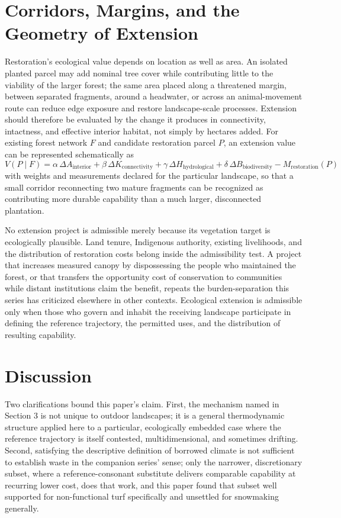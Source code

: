 \documentclass[11pt]{article}
\begin{document}
\section{Corridors, Margins, and the Geometry of Extension}

Restoration's ecological value depends on location as well as area. An isolated planted parcel may add nominal tree cover while contributing little to the viability of the larger forest; the same area placed along a threatened margin, between separated fragments, around a headwater, or across an animal-movement route can reduce edge exposure and restore landscape-scale processes. Extension should therefore be evaluated by the change it produces in connectivity, intactness, and effective interior habitat, not simply by hectares added. For existing forest network $F$ and candidate restoration parcel $P$, an extension value can be represented schematically as
\[
V(P \mid F) = \alpha\,\Delta A_{\text{interior}} + \beta\,\Delta K_{\text{connectivity}} + \gamma\,\Delta H_{\text{hydrological}} + \delta\,\Delta B_{\text{biodiversity}} - M_{\text{restoration}}(P)
\]
with weights and measurements declared for the particular landscape, so that a small corridor reconnecting two mature fragments can be recognized as contributing more durable capability than a much larger, disconnected plantation.

No extension project is admissible merely because its vegetation target is ecologically plausible. Land tenure, Indigenous authority, existing livelihoods, and the distribution of restoration costs belong inside the admissibility test. A project that increases measured canopy by dispossessing the people who maintained the forest, or that transfers the opportunity cost of conservation to communities while distant institutions claim the benefit, repeats the burden-separation this series has criticized elsewhere in other contexts. Ecological extension is admissible only when those who govern and inhabit the receiving landscape participate in defining the reference trajectory, the permitted uses, and the distribution of resulting capability.

\section{Discussion}

Two clarifications bound this paper's claim. First, the mechanism named in Section 3 is not unique to outdoor landscapes; it is a general thermodynamic structure applied here to a particular, ecologically embedded case where the reference trajectory is itself contested, multidimensional, and sometimes drifting. Second, satisfying the descriptive definition of borrowed climate is not sufficient to establish waste in the companion series' sense; only the narrower, discretionary subset, where a reference-consonant substitute delivers comparable capability at recurring lower cost, does that work, and this paper found that subset well supported for non-functional turf specifically and unsettled for snowmaking generally.
\end{document}
